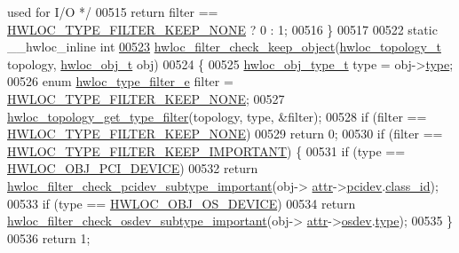 \begin{DoxyCode}
{{       used for I/O */}
00515   \textcolor{keywordflow}{return} filter == \hyperlink{a00193_gga9a5a1f0140cd1952544477833733195ba4f835955414de92c77d99b8419d4647a}{HWLOC\_TYPE\_FILTER\_KEEP\_NONE} ? 0 : 1;
00516 \}
00517 
00522 \textcolor{keyword}{static} \_\_hwloc\_inline \textcolor{keywordtype}{int}
\hyperlink{a00231_ga4d2fdce071e5646ef147c9ff1539d1c9}{00523} \hyperlink{a00231_ga4d2fdce071e5646ef147c9ff1539d1c9}{hwloc\_filter\_check\_keep\_object}(\hyperlink{a00186_ga9d1e76ee15a7dee158b786c30b6a6e38}{hwloc\_topology\_t} topology, 
      \hyperlink{a00238}{hwloc\_obj\_t} obj)
00524 \{
00525   \hyperlink{a00184_gacd37bb612667dc437d66bfb175a8dc55}{hwloc\_obj\_type\_t} type = obj->\hyperlink{a00238_acc4f0803f244867e68fe0036800be5de}{type};
00526   \textcolor{keyword}{enum} \hyperlink{a00193_ga9a5a1f0140cd1952544477833733195b}{hwloc\_type\_filter\_e} filter = 
      \hyperlink{a00193_gga9a5a1f0140cd1952544477833733195ba4f835955414de92c77d99b8419d4647a}{HWLOC\_TYPE\_FILTER\_KEEP\_NONE};
00527   \hyperlink{a00193_ga137ad1178f7a79f2383974d983083401}{hwloc\_topology\_get\_type\_filter}(topology, type, &filter);
00528   \textcolor{keywordflow}{if} (filter == \hyperlink{a00193_gga9a5a1f0140cd1952544477833733195ba4f835955414de92c77d99b8419d4647a}{HWLOC\_TYPE\_FILTER\_KEEP\_NONE})
00529     \textcolor{keywordflow}{return} 0;
00530   \textcolor{keywordflow}{if} (filter == \hyperlink{a00193_gga9a5a1f0140cd1952544477833733195ba63fd24954e18c83ff7eae9588759adb5}{HWLOC\_TYPE\_FILTER\_KEEP\_IMPORTANT}) \{
00531     \textcolor{keywordflow}{if} (type == \hyperlink{a00184_ggacd37bb612667dc437d66bfb175a8dc55a5d8117a54df1fbd3606ab19e42cb0ea9}{HWLOC\_OBJ\_PCI\_DEVICE})
00532       \textcolor{keywordflow}{return} \hyperlink{a00231_ga60203db6459ebf275bf48c40a37661a0}{hwloc\_filter\_check\_pcidev\_subtype\_important}(obj->
      \hyperlink{a00238_accd40e29f71f19e88db62ea3df02adc8}{attr}->\hyperlink{a00242_a4203d713ce0f5beaa6ee0e9bdac70828}{pcidev}.\hyperlink{a00262_aee735352d9f1686fd290fc6d6397c334}{class\_id});
00533     \textcolor{keywordflow}{if} (type == \hyperlink{a00184_ggacd37bb612667dc437d66bfb175a8dc55a51e7280240fd9f25589cbbe538bdb075}{HWLOC\_OBJ\_OS\_DEVICE})
00534       \textcolor{keywordflow}{return} \hyperlink{a00231_gac7d57a6d669820f360cf2a070a396560}{hwloc\_filter\_check\_osdev\_subtype\_important}(obj->
      \hyperlink{a00238_accd40e29f71f19e88db62ea3df02adc8}{attr}->\hyperlink{a00242_a22904c25fe44b323bab5c9bc52660fca}{osdev}.\hyperlink{a00282_a31e019e27e54ac6138d04be639bb96f9}{type});
00535   \}
00536   \textcolor{keywordflow}{return} 1;
}
\end{DoxyCode}
